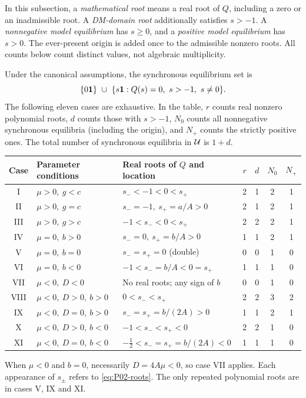 In this subsection, a \emph{mathematical root} means a real root of
$Q$, including a zero or an inadmissible root. A \emph{DM-domain root}
additionally satisfies $s>-1$. A \emph{nonnegative model equilibrium}
has $s\ge0$, and a \emph{positive model equilibrium} has $s>0$.
The ever-present origin is added once to the admissible nonzero roots.
All counts below count distinct values, not algebraic multiplicity.

\begin{theorem}
\label{thm:P02-complete}
Under the canonical assumptions, the synchronous equilibrium set is
\begin{equation}
\label{eq:P02-equilibrium-set}
 \{0\mathbf{1}\}\ \cup\
 \{s\mathbf{1}:Q(s)=0,\ s>-1,\ s\ne0\}.
\end{equation}
The following eleven cases are exhaustive. In the table, $r$ counts
real nonzero polynomial roots, $d$ counts those with $s>-1$, $N_0$
counts all nonnegative synchronous equilibria (including the origin),
and $N_+$ counts the strictly positive ones. The total number of
synchronous equilibria in $\mathcal{U}$ is $1+d$.

\begin{center}
\small
\renewcommand{\arraystretch}{1.18}
\begin{tabular}{@{}c p{} p{} c c c c@{}}
\toprule
Case & Parameter conditions & Real roots of $Q$ and location
 & $r$ & $d$ & $N_0$ & $N_+$\\
\midrule
I & $\mu>0,\ g<c$ & $s_-<-1<0<s_+$ & 2&1&2&1\\
II & $\mu>0,\ g=c$ & $s_-=-1,\ s_+=a/A>0$ & 2&1&2&1\\
III & $\mu>0,\ g>c$ & $-1<s_-<0<s_+$ & 2&2&2&1\\
IV & $\mu=0,\ b>0$ & $s_-=0,\ s_+=b/A>0$ & 1&1&2&1\\
V & $\mu=0,\ b=0$ & $s_-=s_+=0$ (double) & 0&0&1&0\\
VI & $\mu=0,\ b<0$ & $-1<s_-=b/A<0=s_+$ & 1&1&1&0\\
VII & $\mu<0,\ D<0$ & No real roots; any sign of $b$ & 0&0&1&0\\
VIII & $\mu<0,\ D>0,\ b>0$ & $0<s_-<s_+$ & 2&2&3&2\\
IX & $\mu<0,\ D=0,\ b>0$ & $s_-=s_+=b/(2A)>0$ & 1&1&2&1\\
X & $\mu<0,\ D>0,\ b<0$ & $-1<s_-<s_+<0$ & 2&2&1&0\\
XI & $\mu<0,\ D=0,\ b<0$ & $-\tfrac12<s_-=s_+=b/(2A)<0$ & 1&1&1&0\\
\bottomrule
\end{tabular}
\end{center}
When $\mu<0$ and $b=0$, necessarily $D=4A\mu<0$, so case VII
applies. Each appearance of $s_\pm$ refers to \eqref{eq:P02-roots}.
The only repeated polynomial roots are in cases V, IX and XI.


\end{theorem}
